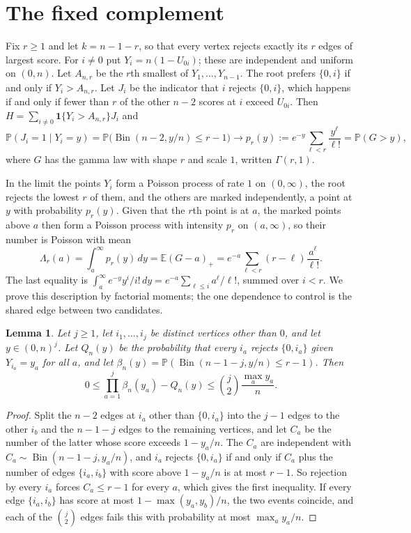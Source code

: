 \documentclass[11pt]{amsart}
\newtheorem{lemma}[theorem]{Lemma}
\theoremstyle{remark}
\numberwithin{equation}{section}
\newcommand{\E}{\mathbb E}
\newcommand{\Pp}{\mathbb P}
\newcommand{\1}{\mathbf 1}
\newcommand{\Bin}{\operatorname{Bin}}
\begin{document}
\section{The fixed complement}\label{sec:fixedr}

Fix $r\ge1$ and let $k=n-1-r$, so that every vertex rejects exactly its $r$ edges of largest score. For $i\ne0$ put $Y_i=n(1-U_{0i})$; these are independent and uniform on $(0,n)$. Let $A_{n,r}$ be the $r$th smallest of $Y_1,\dots,Y_{n-1}$. The root prefers $\{0,i\}$ if and only if $Y_i>A_{n,r}$. Let $J_i$ be the indicator that $i$ rejects $\{0,i\}$, which happens if and only if fewer than $r$ of the other $n-2$ scores at $i$ exceed $U_{0i}$. Then $H=\sum_{i\ne0}\1\{Y_i>A_{n,r}\}J_i$ and
\[
\Pp(J_i=1\mid Y_i=y)=\Pp\bigl(\Bin(n-2,y/n)\le r-1\bigr)\to p_r(y):=e^{-y}\sum_{\ell<r}\frac{y^\ell}{\ell!}=\Pp(G>y),
\]
where $G$ has the gamma law with shape $r$ and scale $1$, written $\Gamma(r,1)$.

In the limit the points $Y_i$ form a Poisson process of rate $1$ on $(0,\infty)$, the root rejects the lowest $r$ of them, and the others are marked independently, a point at $y$ with probability $p_r(y)$. Given that the $r$th point is at $a$, the marked points above $a$ then form a Poisson process with intensity $p_r$ on $(a,\infty)$, so their number is Poisson with mean
\begin{equation}\label{eq:Lambda}
\Lambda_r(a)=\int_a^\infty p_r(y)\,dy=\E(G-a)_+=e^{-a}\sum_{\ell<r}(r-\ell)\frac{a^\ell}{\ell!}.
\end{equation}
The last equality is $\int_a^\infty e^{-y}y^i/i!\,dy=e^{-a}\sum_{\ell\le i}a^\ell/\ell!$, summed over $i<r$. We prove this description by factorial moments; the one dependence to control is the shared edge between two candidates.

\begin{lemma}\label{lem:marks}
Let $j\ge1$, let $i_1,\dots,i_j$ be distinct vertices other than $0$, and let $y\in(0,n)^j$. Let $Q_n(y)$ be the probability that every $i_a$ rejects $\{0,i_a\}$ given $Y_{i_a}=y_a$ for all $a$, and let $\beta_n(y)=\Pp(\Bin(n-1-j,y/n)\le r-1)$. Then
\[
0\le\prod_{a=1}^j\beta_n(y_a)-Q_n(y)\le\binom j2\frac{\max_ay_a}n.
\]
\end{lemma}

\begin{proof}
Split the $n-2$ edges at $i_a$ other than $\{0,i_a\}$ into the $j-1$ edges to the other $i_b$ and the $n-1-j$ edges to the remaining vertices, and let $C_a$ be the number of the latter whose score exceeds $1-y_a/n$. The $C_a$ are independent with $C_a\sim\Bin(n-1-j,y_a/n)$, and $i_a$ rejects $\{0,i_a\}$ if and only if $C_a$ plus the number of edges $\{i_a,i_b\}$ with score above $1-y_a/n$ is at most $r-1$. So rejection by every $i_a$ forces $C_a\le r-1$ for every $a$, which gives the first inequality. If every edge $\{i_a,i_b\}$ has score at most $1-\max(y_a,y_b)/n$, the two events coincide, and each of the $\binom j2$ edges fails this with probability at most $\max_ay_a/n$.
\end{proof}
\end{document}
